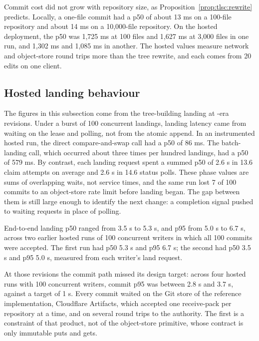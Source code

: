 \documentclass[11pt,letterpaper]{article}
\theoremstyle{definition}
\theoremstyle{remark}
\begin{document}
Commit cost did not grow with repository size, as Proposition~\ref{prop:tlsc:rewrite} predicts. Locally, a one-file commit had a p50 of about 13 ms on a 100-file repository and about 14 ms on a 10,000-file repository. %
On the hosted deployment, the p50 was 1,725 ms at 100 files and 1,627 ms at 3,000 files in one run, and 1,302 ms and 1,085 ms in another. %
The hosted values measure network and object-store round trips more than the tree rewrite, and each comes from 20 edits on one client.

\subsection{Hosted landing behaviour}

The figures in this subsection come from the tree-building landing at -era revisions. Under a burst of 100 concurrent landings, landing latency came from waiting on the lease and polling, not from the atomic append. In an instrumented hosted run, the direct compare-and-swap call had a p50 of 86 ms. %
The batch-landing call, which occurred about three times per hundred landings, had a p50 of 579 ms. %
By contrast, each landing request spent a summed p50 of 2.6 s in 13.6 claim attempts on average and 2.6 s in 14.6 status polls. %
These phase values are sums of overlapping waits, not service times, and the same run lost 7 of 100 commits to an object-store rate limit before landing began. %
The gap between them is still large enough to identify the next change: a completion signal pushed to waiting requests in place of polling.

End-to-end landing p50 ranged from 3.5 s to 5.3 s, and p95 from 5.0 s to 6.7 s, across two earlier hosted runs of 100 concurrent writers in which all 100 commits were accepted. %
The first run had p50 5.3 s and p95 6.7 s; the second had p50 3.5 s and p95 5.0 s, measured from each writer's land request. %

At those revisions the commit path missed its design target: across four hosted runs with 100 concurrent writers, commit p95 was between 2.8 s and 3.7 s, against a target of 1 s. %
Every commit waited on the Git store of the reference implementation, Cloudflare Artifacts, which accepted one receive-pack per repository at a time, and on several round trips to the authority. %
The first is a constraint of that product, not of the object-store primitive, whose contract is only immutable puts and gets.
\end{document}
